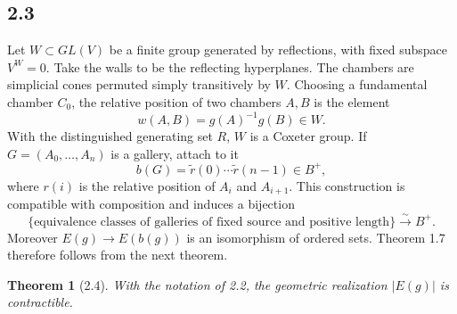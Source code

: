 \documentclass[11pt]{article}
\newtheorem{theorem}{Theorem}[section]
\begin{document}
\subsection*{2.3}
Let $W\subset GL(V)$ be a finite group generated by reflections, with fixed subspace $V^W=0$. Take the walls to be the reflecting hyperplanes. The chambers are simplicial cones permuted simply transitively by $W$. Choosing a fundamental chamber $C_0$, the relative position of two chambers $A,B$ is the element
\[
w(A,B)=g(A)^{-1}g(B)\in W.
\]
With the distinguished generating set $R$, $W$ is a Coxeter group. If $G=(A_0,\ldots,A_n)$ is a gallery, attach to it
\begin{equation}
b(G)=\tilde r(0)\cdots\tilde r(n-1)\in B^+,
\tag{2.3.1}
\end{equation}
where $r(i)$ is the relative position of $A_i$ and $A_{i+1}$. This construction is compatible with composition and induces a bijection
\begin{equation}
\{\text{equivalence classes of galleries of fixed source and positive length}\}
\xrightarrow{\sim} B^+ .\tag{2.3.3}
\end{equation}
Moreover $E(g)\to E(b(g))$ is an isomorphism of ordered sets. Theorem 1.7 therefore follows from the next theorem.

\begin{theorem}[2.4]
With the notation of 2.2, the geometric realization $|E(g)|$ is contractible.
\end{theorem}
\end{document}
